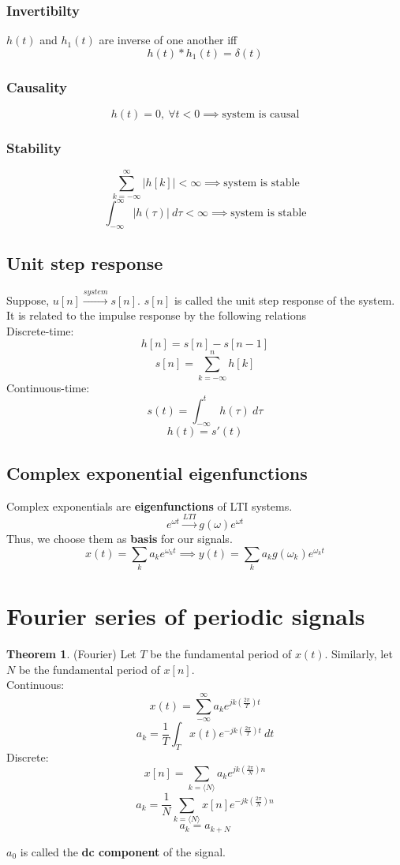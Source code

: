 \documentclass[10pt, a4paper]{extarticle}
\theoremstyle{definition}
\newtheorem*{thm}{Theorem}
\begin{document}
\subsubsection{Invertibilty}
$h(t)$ and $h_1(t)$ are inverse of one another iff \[h(t)*h_1(t)=\delta(t)\]
\subsubsection{Causality}
\[h(t)=0,\ \forall t<0\implies\text{system is causal}\]
\subsubsection{Stability}
\[\sum_{k=-\infty}^{\infty}|h[k]|<\infty\implies\text{system is stable}\]
\[\int_{-\infty}^{\infty}|h(\tau)|\ d\tau<\infty\implies\text{system is stable}\]

\subsection{Unit step response}
Suppose, $u[n]\xrightarrow{system}s[n]$. $s[n]$ is called the unit step response of the system.\\
It is related to the impulse response by the following relations\\
Discrete-time:
\[h[n]=s[n]-s[n-1]\]
\[s[n]=\sum_{k=-\infty}^nh[k]\]
Continuous-time:
\[s(t)=\int_{-\infty}^{t}h(\tau)\ d\tau\]
\[h(t)=s'(t)\]

\subsection{Complex exponential eigenfunctions}
Complex exponentials are \textbf{eigenfunctions} of LTI systems.
\[e^{\omega t}\xrightarrow{LTI}g(\omega)e^{\omega t}\]
Thus, we choose them as \textbf{basis} for our signals.
\[x(t)=\sum_ka_ke^{\omega_k t}\implies y(t)=\sum_k a_kg(\omega_k)e^{\omega_k t}\]

\section{Fourier series of periodic signals}
\begin{thm}(Fourier)
	Let $T$ be the fundamental period of $x(t)$. Similarly, let $N$ be the fundamental period of $x[n]$.\\
	Continuous:
	\[x(t)=\sum_{-\infty}^{\infty}a_ke^{jk\left(\frac{2\pi}{T}\right)t}\tag*{(synthesis)}\]
	\[a_k=\frac{1}{T}\int_Tx(t)e^{-jk\left(\frac{2\pi}{T}\right)t}\ dt\tag*{(analysis)}\]
	Discrete:
	\[x[n]=\sum_{k=\langle N\rangle}a_ke^{jk\left(\frac{2\pi}{N}\right)n}\tag*{(synthesis)}\]
	\[a_k=\frac{1}{N}\sum_{k=\langle N\rangle}x[n]e^{-jk\left(\frac{2\pi}{N}\right)n}\tag*{(analysis)}\]
	\[a_k=a_{k+N}\]
\end{thm}
$a_0$ is called the \textbf{dc component} of the signal.
\end{document}
